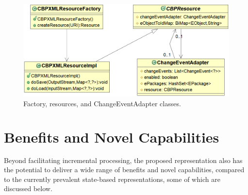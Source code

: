 \documentclass{llncs}
\begin{document}


\begin{figure}[th]
\centering
\includegraphics[scale=0.32]{resources}
\caption{Factory, resources, and ChangeEventAdapter classes.}
\label{fig:resources}
\end{figure}

\section{Benefits and Novel Capabilities}
\label{sec:benefits_and_novel_capabilities}
Beyond facilitating incremental processing, the proposed representation also has the potential to deliver a wide range of benefits and novel capabilities, compared to the currently prevalent state-based representations, some of which are discussed below.
\end{document}
